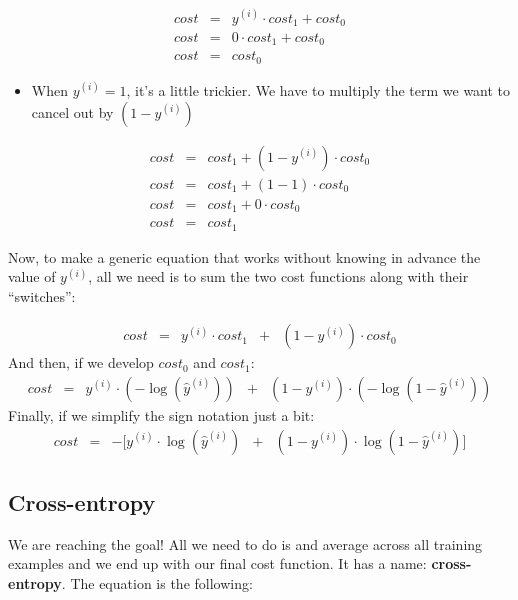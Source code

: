 \documentclass[]{article}
\providecommand{\tightlist}{%
  \setlength{\itemsep}{0pt}\setlength{\parskip}{0pt}}
\begin{document}
\large

\[
\begin{matrix}
cost & = & y^{(i)} \cdot cost_1 + cost_0 \\
cost & = & 0 \cdot cost_1 + cost_0 \\
cost & = & cost_0
\end{matrix}
\] \normalsize

\begin{itemize}
\tightlist
\item
  When \(y^{(i)} = 1\), it's a little trickier. We have to multiply the
  term we want to cancel out by \((1 - y^{(i)})\)
\end{itemize}

\large

\[
\begin{matrix}
cost & = & cost_1 + (1 - y^{(i)}) \cdot cost_0 \\
cost & = & cost_1 + (1 - 1) \cdot cost_0 \\
cost & = & cost_1 + 0 \cdot cost_0  \\
cost & = & cost_1
\end{matrix}
\] \normalsize

Now, to make a generic equation that works without knowing in advance
the value of \(y^{(i)}\), all we need is to sum the two cost functions
along with their ``switches'':

\large

\[
\begin{matrix}
cost & = & y^{(i)} \cdot cost_1 & + & (1 - y^{(i)}) \cdot cost_0
\end{matrix}
\] \normalsize And then, if we develop \(cost_0\) and \(cost_1\): \large
\[
\begin{matrix}
cost & = & y^{(i)} \cdot (-\log(\hat{y}^{(i)})) & + & (1 - y^{(i)}) \cdot (-\log(1 - \hat{y}^{(i)}))
\end{matrix}
\] \normalsize Finally, if we simplify the sign notation just a bit:
\large \[
\begin{matrix}
cost & = & -[y^{(i)}\cdot\log(\hat{y}^{(i)}) & + & (1 - y^{(i)})\cdot\log(1 - \hat{y}^{(i)})]
\end{matrix}
\] \normalsize

\hypertarget{cross-entropy}{%
\subsection{Cross-entropy}\label{cross-entropy}}

We are reaching the goal! All we need to do is and average across all
training examples and we end up with our final cost function. It has a
name: \textbf{cross-entropy}. The equation is the following:
\end{document}
